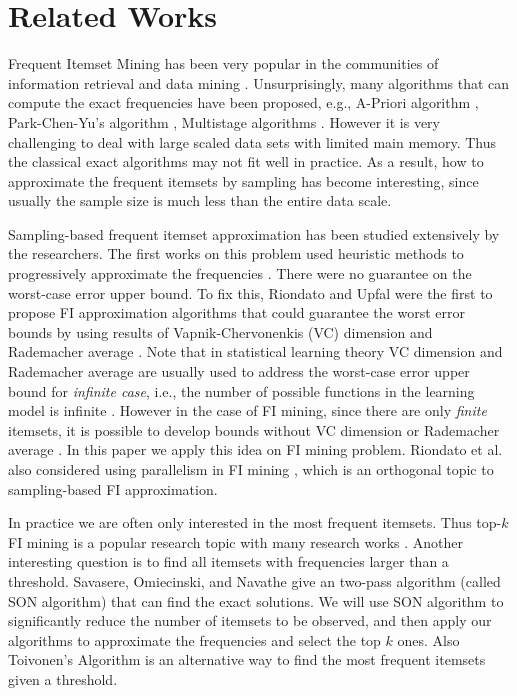 \documentclass{article}
\begin{document}
\section{Related Works}
\label{sec:rw}
Frequent Itemset Mining has been very popular in the communities of information retrieval and data mining \cite{LRU14}. Unsurprisingly, many algorithms that can compute the exact frequencies have been proposed, e.g., A-Priori algorithm \cite{AIS93}, Park-Chen-Yu's algorithm \cite{PCY95}, Multistage algorithms \cite{FSG99}.
However it is very challenging to deal with large scaled data sets with limited main memory. Thus the classical exact algorithms may not fit well in practice. As a result, how to approximate the frequent itemsets by sampling has become interesting, since usually the sample size is much less than the entire data scale.

Sampling-based frequent itemset approximation has been studied extensively by the researchers. The first works on this problem used heuristic methods to progressively approximate the frequencies \cite{CHS02,CCY05,Parth02}. There were no guarantee on the worst-case error upper bound. To fix this, Riondato and Upfal were the first to propose FI approximation algorithms that could guarantee the worst error bounds by using results of Vapnik-Chervonenkis (VC) dimension \cite{RU12,RU14} and Rademacher average \cite{RU15}. Note that in statistical learning theory VC dimension and Rademacher average are usually used to address the worst-case error upper bound for \emph{infinite case}, i.e., the number of possible functions in the learning model is infinite \cite{BBL04}. However in the case of FI mining, since there are only \emph{finite} itemsets, it is possible to develop bounds without VC dimension or Rademacher average \cite{BBL04}. In this paper we apply this idea on FI mining problem. Riondato et al. also considered using parallelism in FI mining \cite{RDF12}, which is an orthogonal topic to sampling-based FI approximation.

In practice we are often only interested in the most frequent itemsets. Thus top-$k$ FI mining is a popular research topic with many research works \cite{PRU10,SW02,RU15,RV14}. Another interesting question is to find all itemsets with frequencies larger than a threshold. Savasere, Omiecinski, and Navathe \cite{SON95} give an two-pass algorithm (called SON algorithm) that can find the exact solutions. We will use SON algorithm to significantly reduce the number of itemsets to be observed, and then apply our algorithms to approximate the frequencies and select the top $k$ ones. Also Toivonen’s Algorithm \cite{Toi96} is an alternative way to find the most frequent itemsets given a threshold.
\end{document}
